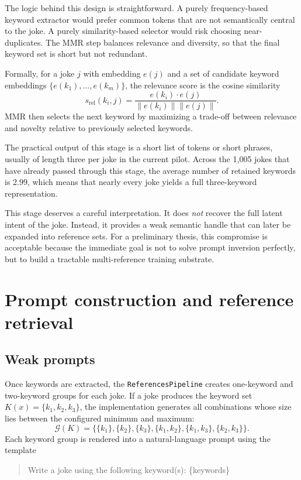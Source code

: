 \documentclass[14pt,a4paper]{extreport}
\begin{document}
The logic behind this design is straightforward. A purely frequency-based keyword extractor would prefer common tokens that are not semantically central to the joke. A purely similarity-based selector would risk choosing near-duplicates. The MMR step balances relevance and diversity, so that the final keyword set is short but not redundant.

Formally, for a joke \(j\) with embedding \(e(j)\) and a set of candidate keyword embeddings \(\{e(k_1), \dots, e(k_m)\}\), the relevance score is the cosine similarity
\[
  s_{\text{rel}}(k_i, j)=\frac{e(k_i)\cdot e(j)}{\|e(k_i)\|\|e(j)\|}.
\]
MMR then selects the next keyword by maximizing a trade-off between relevance and novelty relative to previously selected keywords.

The practical output of this stage is a short list of tokens or short phrases, usually of length three per joke in the current pilot. Across the 1{,}005 jokes that have already passed through this stage, the average number of retained keywords is 2.99, which means that nearly every joke yields a full three-keyword representation.

This stage deserves a careful interpretation. It does \emph{not} recover the full latent intent of the joke. Instead, it provides a weak semantic handle that can later be expanded into reference sets. For a preliminary thesis, this compromise is acceptable because the immediate goal is not to solve prompt inversion perfectly, but to build a tractable multi-reference training substrate.

\section{Prompt construction and reference retrieval}

\subsection{Weak prompts}

Once keywords are extracted, the \texttt{ReferencesPipeline} creates one-keyword and two-keyword groups for each joke. If a joke produces the keyword set \(K(x)=\{k_1,k_2,k_3\}\), the implementation generates all combinations whose size lies between the configured minimum and maximum:
\[
  \mathcal{G}(K)=\{ \{k_1\}, \{k_2\}, \{k_3\}, \{k_1,k_2\}, \{k_1,k_3\}, \{k_2,k_3\}\}.
\]
Each keyword group is rendered into a natural-language prompt using the template
\begin{quote}
  \ttfamily
  Write a joke using the following keyword(s): \{keywords\}
\end{quote}
\end{document}
